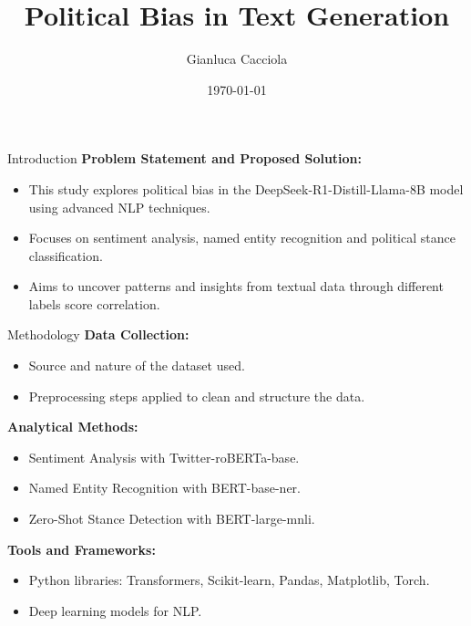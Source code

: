 \documentclass{beamer}
\title{Political Bias in Text Generation}
\author{Gianluca Cacciola}
\date{\today}
\begin{document}
\begin{frame}
    \titlepage
\end{frame}

\begin{frame}{Introduction}
    \textbf{Problem Statement and Proposed Solution:}
    \begin{itemize}
        \item This study explores political bias in the DeepSeek-R1-Distill-Llama-8B model using advanced NLP techniques.
        \item Focuses on sentiment analysis, named entity recognition and political stance classification.
        \item Aims to uncover patterns and insights from textual data through different labels score correlation.
    \end{itemize}
\end{frame}

\begin{frame}{Methodology}
    \textbf{Data Collection:}
    \begin{itemize}
        \item Source and nature of the dataset used.
        \item Preprocessing steps applied to clean and structure the data.
    \end{itemize}
    
    \textbf{Analytical Methods:}
    \begin{itemize}
        \item Sentiment Analysis with Twitter-roBERTa-base.
        \item Named Entity Recognition with BERT-base-ner.
        \item Zero-Shot Stance Detection with BERT-large-mnli.
    \end{itemize}
    
    \textbf{Tools and Frameworks:}
    \begin{itemize}
        \item Python libraries: Transformers, Scikit-learn, Pandas, Matplotlib, Torch.
        \item Deep learning models for NLP.
    \end{itemize}
\end{frame}
\end{document}
